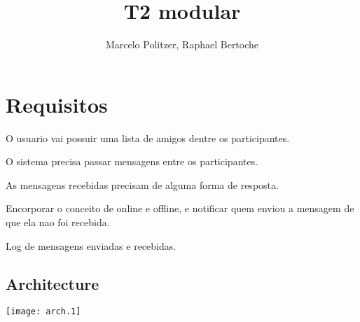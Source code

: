 \documentclass{article}
\title{T2 modular}
\author{Marcelo Politzer, Raphael Bertoche}
\begin{document}
\maketitle

\section{Requisitos}

\begin{list}{*}{}
\item O usuario vai possuir uma lista de amigos dentre os participantes.
\item O sistema precisa passar mensagens entre os participantes.
\item As mensagens recebidas precisam de alguma forma de resposta.
\item Encorporar o conceito de online e offline, e notificar quem enviou a
mensagem de que ela nao foi recebida.
\item Log de mensagens enviadas e recebidas.
\end{list}

\subsection{Architecture}
\texttt{[image: arch.1]}
\end{document}

